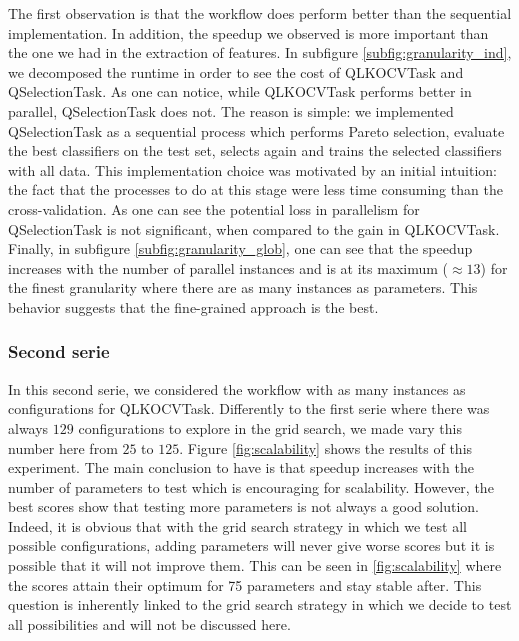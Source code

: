 \documentclass[10pt, conference, compsocconf]{IEEEtran}
\begin{document}
The first observation is that the workflow does perform better than the sequential implementation. 
In addition, the speedup we observed is more important than the one we had in the extraction of features. 
In subfigure \ref{subfig:granularity_ind}, we decomposed the runtime in order to see the cost of QLKOCVTask and QSelectionTask. 
As one can notice, while QLKOCVTask performs better in parallel, QSelectionTask does not. The reason is simple: we implemented QSelectionTask as a sequential 
process which performs Pareto selection, evaluate the best classifiers on the test set, selects again and trains the selected classifiers with all data. This 
implementation choice was motivated by an initial intuition: the fact that the processes to do at this stage 
were less time consuming than the cross-validation. As one can see the potential loss in parallelism for QSelectionTask is not significant, when compared to the 
gain in QLKOCVTask. Finally, in subfigure \ref{subfig:granularity_glob}, one can see that the speedup increases with the number of parallel instances and is at its maximum ($\approx 13$) for the finest granularity where there are as many instances as parameters. This behavior 
suggests that the fine-grained approach is the best. 


\subsubsection{Second serie}

In this second serie, we considered the workflow with as many instances as configurations for QLKOCVTask. Differently to the first serie where there was 
always $129$ configurations to explore in the grid search, we made vary this number here from $25$ to $125$. 
Figure \ref{fig:scalability} shows the results of this experiment. The main conclusion to have is that speedup increases with the number of parameters to test which is encouraging for scalability. However, the best scores show that testing more parameters is not always a good solution. Indeed, it is obvious that with the grid search strategy in which we test all possible configurations, adding parameters will never give worse scores but it is possible that it will not improve them. This can be seen in \ref{fig:scalability} where the scores attain their optimum for 75 parameters and stay stable after. This question is inherently linked to the grid search strategy in which we decide to test all possibilities and will not be discussed here.

\setlength{\belowcaptionskip}{-6pt}
\setlength{\intextsep}{0pt}
\setlength{\textfloatsep}{1pt}
\setlength{\floatsep}{0pt}
\end{document}

